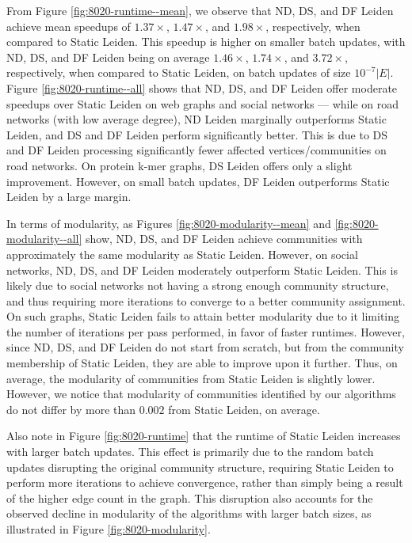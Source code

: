 From Figure \ref{fig:8020-runtime--mean}, we observe that ND, DS, and DF Leiden achieve mean speedups of $1.37\times$, $1.47\times$, and $1.98\times$, respectively, when compared to Static Leiden. This speedup is higher on smaller batch updates, with ND, DS, and DF Leiden being on average $1.46\times$, $1.74\times$, and $3.72\times$, respectively, when compared to Static Leiden, on batch updates of size $10^{-7}|E|$. Figure \ref{fig:8020-runtime--all} shows that ND, DS, and DF Leiden offer moderate speedups over Static Leiden on web graphs and social networks --- while on road networks (with low average degree), ND Leiden marginally outperforms Static Leiden, and DS and DF Leiden perform significantly better. This is due to DS and DF Leiden processing significantly fewer affected vertices/communities on road networks. On protein k-mer graphs, DS Leiden offers only a slight improvement. However, on small batch updates, DF Leiden outperforms Static Leiden by a large margin.

In terms of modularity, as Figures \ref{fig:8020-modularity--mean} and \ref{fig:8020-modularity--all} show, ND, DS, and DF Leiden achieve communities with approximately the same modularity as Static Leiden. However, on social networks, ND, DS, and DF Leiden moderately outperform Static Leiden. This is likely due to social networks not having a strong enough community structure, and thus requiring more iterations to converge to a better community assignment. On such graphs, Static Leiden fails to attain better modularity due to it limiting the number of iterations per pass performed, in favor of faster runtimes. However, since ND, DS, and DF Leiden do not start from scratch, but from the community membership of Static Leiden, they are able to improve upon it further. Thus, on average, the modularity of communities from Static Leiden is slightly lower. However, we notice that modularity of communities identified by our algorithms do not differ by more than $0.002$ from Static Leiden, on average.

Also note in Figure \ref{fig:8020-runtime} that the runtime of Static Leiden increases with larger batch updates. This effect is primarily due to the random batch updates disrupting the original community structure, requiring Static Leiden to perform more iterations to achieve convergence, rather than simply being a result of the higher edge count in the graph. This disruption also accounts for the observed decline in modularity of the algorithms with larger batch sizes, as illustrated in Figure \ref{fig:8020-modularity}.

